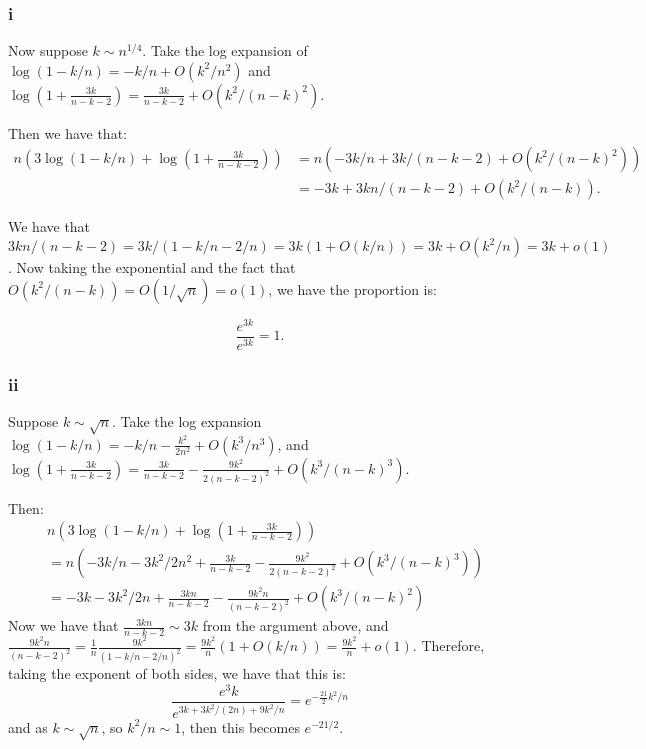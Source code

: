 \documentclass[]{article}
\theoremstyle{definition}
\numberwithin{theorem}{section}
\numberwithin{equation}{section}
\begin{document}
\subsubsection{i}
Now suppose $k \sim n^{1/4}$.
Take the log expansion of
$\log(1 - k/n) = -k/n + O(k^2/n^2)$ and $\log\left(1 + \frac{3k}{n - k - 2}\right) = \frac{3k}{n - k - 2} + O(k^2/(n- k)^2)$. 

Then we have that:
\begin{align*}
	n \left( 3 \log(1 - k/n) + \log\left(1 + \frac{3k}{n - k - 2}\right)\right) &= n \left(- 3k/n + 3k/(n - k - 2) + O(k^2/(n - k)^2)\right) \\
	&= -3k + 3kn/(n - k - 2) + O(k^2/(n - k)).
\end{align*}

We have that $3kn/(n - k - 2) = 3k/(1 - k/n - 2/n) = 3k(1 + O(k/n)) = 3k + O(k^2/n) =  3k + o(1)$. 
Now taking the exponential and the fact that $O(k^2/(n - k)) = O(1/\sqrt{n}) = o(1)$, we have the proportion is:

\begin{equation}
	\frac{e^{3k}}{e^{3k}} = 1. 
\end{equation}

\subsubsection{ii}
Suppose $k \sim \sqrt{n}$. 
Take the log expansion 
$\log(1 - k/n)  = -k/n - \frac{k^2}{2n^2} + O(k^3/n^3)$, and $\log\left(1 + \frac{3k}{n - k - 2}\right) = \frac{3k}{n - k - 2} - \frac{9k^2}{2(n - k - 2)^2} + O(k^3/(n - k)^3)$. 

Then:
\begin{align*}
	&n \left( 3 \log(1 - k/n) + \log\left(1 + \frac{3k}{n - k - 2}\right)\right) \\
	&= n \left(-3k/n - 3k^2/2n^2 + \frac{3k}{n - k - 2} - \frac{9k^2}{2(n - k - 2)^2} + O(k^3/(n - k)^3)\right)\\
	&= -3k - 3k^2/2n + \frac{3kn}{n - k - 2} - \frac{9k^2 n}{(n - k - 2)^2} + O(k^3/(n - k)^2)
\end{align*}
Now we have that $\frac{3kn}{n - k - 2}  \sim 3k$ from the argument above, and $\frac{9k^2 n}{(n - k - 2)^2} = \frac{1}{n} \frac{9 k^2}{(1 - k/n - 2/n)^2} = \frac{9k^2}{n}(1 + O(k/n)) = \frac{9k^2}{n} + o(1)$. Therefore, taking the exponent of both sides, we have that this is:
\begin{equation}
	\frac{e^3k }{e^{3k + 3k^2/(2n) + 9k^2/n}} = e^{-\frac{21}{2} k^2/n}
\end{equation}
and as $k \sim \sqrt{n}$, so $k^2/n \sim 1$, then this becomes $e^{-21/2}$. 
\end{document}
